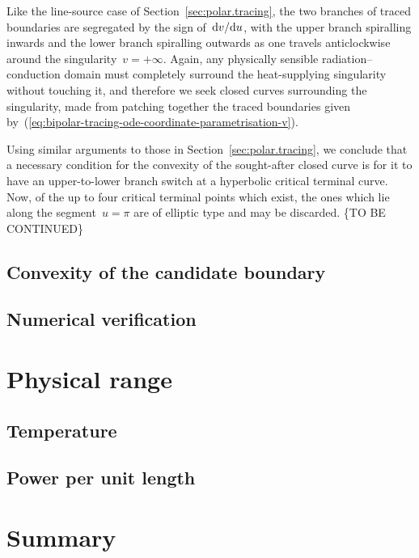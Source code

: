Like the line-source case of Section~\ref{sec:polar.tracing},
the two branches of traced boundaries are segregated
by the sign of~$\mathop{}\!\mathrm{d} v / {\mathop{}\!\mathrm{d} u}$,
with the upper branch spiralling inwards
and the lower branch spiralling outwards
as one travels anticlockwise
around the singularity~$v = +\infty$.
Again, any physically sensible radiation--conduction domain
must completely surround the heat-supplying singularity without touching it,
and therefore we seek closed curves surrounding the singularity,
made from patching together the traced boundaries
given by~(\ref{eq:bipolar-tracing-ode-coordinate-parametrisation-v}).

Using similar arguments to those in Section~\ref{sec:polar.tracing},
we conclude that a necessary condition
for the convexity of the sought-after closed curve
is for it to have an upper-to-lower branch switch
at a hyperbolic critical terminal curve.
Now, of the up to four critical terminal points which exist,
the ones which lie along the segment~$u = \pi$
are of elliptic type and may be discarded.
\{TO BE CONTINUED\}

\subsection{Convexity of the candidate boundary}
\label{sec:bipolar.tracing.convex}


\subsection{Numerical verification}
\label{sec:bipolar.tracing.verification}


\section{Physical range}
\label{sec:bipolar.physical}


\subsection{Temperature}
\label{sec:bipolar.physical.temperature}


\subsection{Power per unit length}
\label{sec:bipolar.physical.power}


\section{Summary}
\label{sec:bipolar.summary}

